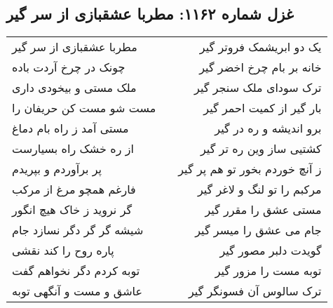 \begin{center}
\section*{غزل شماره ۱۱۶۲: مطربا عشقبازی از سر گیر}
\label{sec:1162}
\begin{longtable}{l p{0.5cm} r}
مطربا عشقبازی از سر گیر
&&
یک دو ابریشمک فروتر گیر
\\
چونک در چرخ آردت باده
&&
خانه بر بام چرخ اخضر گیر
\\
ملک مستی و بیخودی داری
&&
ترک سودای ملک سنجر گیر
\\
مست شو مست کن حریفان را
&&
بار گیر از کمیت احمر گیر
\\
مستی آمد ز راه بام دماغ
&&
برو اندیشه و ره در گیر
\\
از ره خشک راه بسیارست
&&
کشتیی ساز وین ره تر گیر
\\
پر برآوردم و بپریدم
&&
ز آنچ خوردم بخور تو هم پر گیر
\\
فارغم همچو مرغ از مرکب
&&
مرکبم را تو لنگ و لاغر گیر
\\
گر نروید ز خاک هیچ انگور
&&
مستی عشق را مقرر گیر
\\
شیشه گر گر دگر نسازد جام
&&
جام می عشق را میسر گیر
\\
پاره روح را کند نقشی
&&
گویدت دلبر مصور گیر
\\
توبه کردم دگر نخواهم گفت
&&
توبه مست را مزور گیر
\\
عاشق و مست و آنگهی توبه
&&
ترک سالوس آن فسونگر گیر
\\
\end{longtable}
\end{center}
